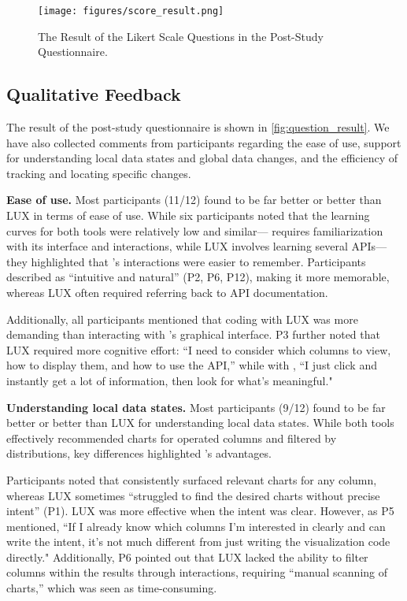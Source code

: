 \begin{figure}[!htb]
    \centering
    \texttt{[image: figures/score\_result.png]}
    \caption{The Result of the Likert Scale Questions in the Post-Study Questionnaire. }
    \label{fig:question_result}
\end{figure}

\subsection{Qualitative Feedback}
\label{sec:feedback}

The result of the post-study questionnaire is shown in \autoref{fig:question_result}. We have also collected comments from participants regarding the ease of use, support for understanding local data states and global data changes, and the efficiency of tracking and locating specific changes.

\textbf{Ease of use.}
Most participants (11/12) found \system{} to be far better or better than LUX in terms of ease of use. 
While six participants noted that the learning curves for both tools were relatively low and similar—\system{} requires familiarization with its interface and interactions, while LUX involves learning several APIs—they highlighted that \system{}'s interactions were easier to remember. 
Participants described \system{} as ``intuitive and natural'' (P2, P6, P12), making it more memorable, whereas LUX often required referring back to API documentation.

Additionally, all participants mentioned that coding with LUX was more demanding than interacting with \system{}'s graphical interface. 
P3 further noted that LUX required more cognitive effort: ``I need to consider which columns to view, how to display them, and how to use the API,'' while with \system{}, ``I just click and instantly get a lot of information, then look for what’s meaningful."

\textbf{Understanding local data states. }
Most participants (9/12) found \system{} to be far better or better than LUX for understanding local data states. While both tools effectively recommended charts for operated columns and filtered by distributions, key differences highlighted \system{}'s advantages.

Participants noted that \system{} consistently surfaced relevant charts for any column, whereas LUX sometimes ``struggled to find the desired charts without precise intent'' (P1). 
LUX was more effective when the intent was clear. 
However, as P5 mentioned, ``If I already know which columns I'm interested in clearly and can write the intent, it's not much different from just writing the visualization code directly."
Additionally, P6 pointed out that LUX lacked the ability to filter columns within the results through interactions, requiring ``manual scanning of charts,'' which was seen as time-consuming. 

